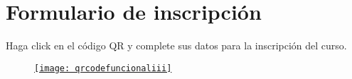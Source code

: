 \section*{Formulario de inscripción}

Haga click en el código QR y complete sus datos para la inscripción
del curso.

\begin{figure}[ht!]
  \centering
  \href{}{
    \texttt{[image: qrcodefuncionaliii]}}
\end{figure}